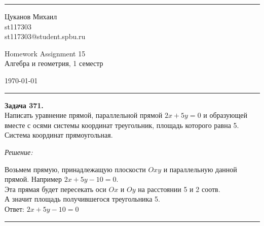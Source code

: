 \documentclass[a4paper, 12pt]{article}
\newenvironment{problem}[2][Задача]
    { \begin{mdframed}[backgroundcolor=gray!10] \textbf{#1 #2.} \\}
    {  \end{mdframed}}
\newenvironment{solution}
    {\textit{Решение: }}
    {\noindent\rule{7in}{1.5pt}}
\begin{document}

\fancyhead[C]{}
\hrule \medskip %
\begin{minipage}{0.295\textwidth}
\raggedright\footnotesize
Цуканов Михаил \hfill\\
st117303 \hfill\\
st117303@student.spbu.ru
\end{minipage}
\begin{minipage}{0.4\textwidth}
\centering\large
Homework Assignment 15\\
\normalsize
Алгебра и геометрия, 1 семестр\\
\end{minipage}
\begin{minipage}{0.295\textwidth}
\raggedleft
\today\hfill\\
\end{minipage}
\medskip\hrule
\bigskip




\begin{problem}{371}
Написать уравнение прямой, параллельной прямой ${2x+5y=0}$ и образующей вместе с осями системы координат треугольник,
площадь которого равна 5. Система координат прямоугольная.
\end{problem}
\begin{solution}

Возьмем прямую, принадлежащую плоскости $Oxy$ и параллельную данной прямой. Например $2x+5y-10=0$. \\
Эта прямая будет пересекать оси $Ox$ и $Oy$ на расстоянии 5 и 2 соотв. \\
А значит площадь получившегося треугольника 5. \\
Ответ: $2x+5y-10=0$

\end{solution}
\end{document}
